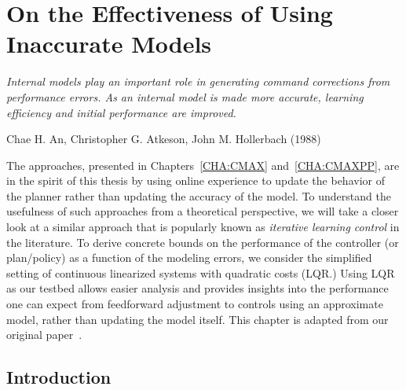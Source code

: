 \chapter{On the Effectiveness of Using Inaccurate Models}
\label{CHA:ILC}

\epigraph{\textit{Internal models play an important role in generating
    command corrections from performance errors. As an internal model
    is made more accurate, learning efficiency and initial performance
    are improved.}}{Chae H. An, Christopher G. Atkeson, John
  M. Hollerbach (1988)}

The approaches, presented in Chapters~\ref{CHA:CMAX}
and~\ref{CHA:CMAXPP}, are
in the spirit of this thesis by using online experience to update the
behavior of the planner rather than updating the accuracy of the
model. To understand the usefulness of such approaches from a
theoretical perspective, we will take a closer look at a similar
approach that is popularly known as \textit{iterative learning
  control} in the literature. To derive concrete bounds on the
performance of the controller (or plan/policy) as a function of the
modeling errors, we consider the simplified setting of continuous
linearized systems with quadratic costs (LQR.) Using LQR as our
testbed allows easier analysis and provides insights into the
performance one can expect from feedforward adjustment to controls
using an approximate model, rather than updating the model itself. This chapter
is adapted from our original paper~\cite{ilc}.

\section{Introduction}
\label{sec:intro}

